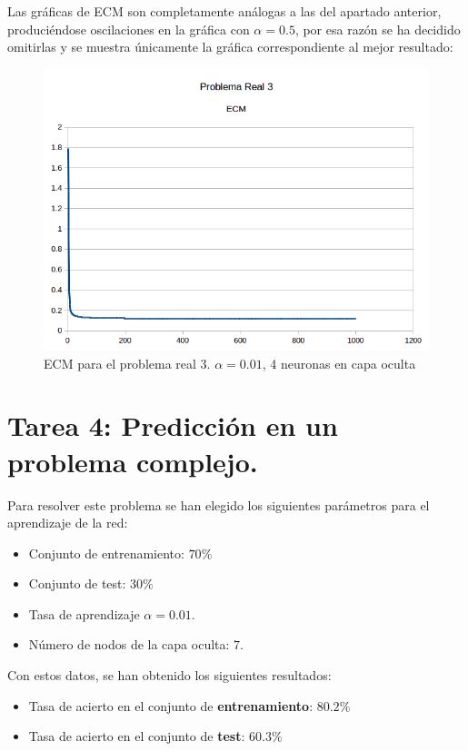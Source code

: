 \documentclass[spanish]{assignment}
\begin{document}
	Las gráficas de ECM son completamente análogas a las del apartado anterior, produciéndose oscilaciones en la gráfica con $\alpha = 0.5$, por esa razón se ha decidido omitirlas y se muestra únicamente la gráfica correspondiente al mejor resultado:	
	\begin{figure}[h]
		\centering
		\includegraphics[scale=0.4]{PR3ECM.png}		
		\caption{ECM para el problema real 3. $\alpha = 0.01$, 4 neuronas en capa oculta}				
	\end{figure}

	\section{Tarea 4: Predicción en un problema complejo.}
	Para resolver este problema se han elegido los siguientes parámetros para el aprendizaje de la red:
	\begin{itemize}
		\item Conjunto de entrenamiento: $70\%$
		\item Conjunto de test: $30\%$
		\item Tasa de aprendizaje $\alpha = 0.01$.		
		\item Número de nodos de la capa oculta: $7$.
	\end{itemize}
	
	Con estos datos, se han obtenido los siguientes resultados:
	\begin{itemize}
		\item Tasa de acierto en el conjunto de \textbf{entrenamiento}: $80.2\%$
		\item Tasa de acierto en el conjunto de \textbf{test}: $60.3\%$
	\end{itemize}
	
\end{document}
